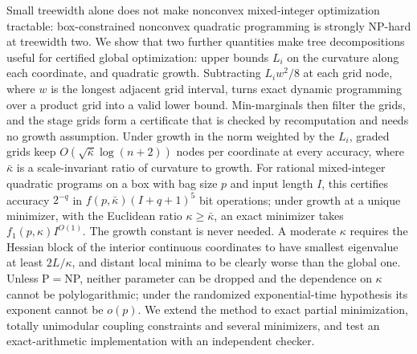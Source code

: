 Small treewidth alone does not make nonconvex mixed-integer optimization
tractable: box-constrained nonconvex quadratic programming is strongly
NP-hard at treewidth two. We show that two further quantities make tree
decompositions useful for certified global optimization: upper bounds $L_i$
on the curvature along each coordinate, and quadratic growth. Subtracting
$L_iw^2/8$ at each grid node, where $w$ is the longest adjacent grid
interval, turns exact dynamic programming over a product grid into a valid
lower bound. Min-marginals then filter the grids, and the stage
grids form a certificate that is checked by recomputation and needs no
growth assumption. Under growth in the norm weighted by the $L_i$, graded
grids keep $O(\sqrt{\bar\kappa}\log(n+2))$ nodes per coordinate at every
accuracy, where $\bar\kappa$ is a scale-invariant ratio of curvature to
growth. For rational mixed-integer quadratic programs on a box with bag size
$p$ and input length $I$, this certifies accuracy $2^{-q}$ in
$f(p,\bar\kappa)(I+q+1)^5$ bit operations; under growth at a unique
minimizer, with the Euclidean ratio $\kappa\ge\bar\kappa$, an exact
minimizer takes $f_1(p,\kappa)I^{O(1)}$. The growth constant is never
needed. A moderate $\kappa$ requires the Hessian block of the interior continuous
coordinates to have smallest eigenvalue at least $2L/\kappa$, and distant
local minima to be clearly worse than the global one. Unless P${}={}$NP, neither parameter can be
dropped and the dependence on $\kappa$ cannot be polylogarithmic; under the
randomized exponential-time hypothesis its exponent cannot be $o(p)$. We
extend the method to exact partial minimization, totally unimodular coupling
constraints and several minimizers, and test an exact-arithmetic
implementation with an independent checker.
